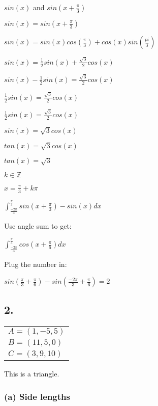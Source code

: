 \documentclass[12pt,a4paper]{article}
\begin{document}
\noindent $sin(x)$ and $sin(x+\frac{\pi}{3})$

\noindent $sin(x) = sin(x + \frac{\pi}{3})$

\noindent $sin(x) = sin(x) cos(\frac{\pi}{3}) + cos(x) sin(\frac{pi}{3})$

\noindent $sin(x) = \frac{1}{2} sin(x) + \frac{\sqrt{3}}{2} cos(x)$

\noindent $sin(x) - \frac{1}{2} sin(x) = \frac{\sqrt{3}}{2} cos(x)$

\noindent $\frac{1}{2} sin(x) = \frac{\sqrt{3}}{2} cos(x)$

\noindent $\frac{1}{2} sin(x) = \frac{\sqrt{3}}{2} cos(x)$

\noindent $sin(x) = \sqrt{3} cos(x)$

\noindent $tan(x) = \sqrt{3} cos(x)$

\noindent $tan(x) = \sqrt{3}$

\noindent $k \in \mathds{Z}$
\newline

\noindent $\boxed{x = \frac{\pi}{3} + k \pi}$
\newpage

\noindent $\int_{\frac{-2\pi}{3}}^{\frac{\pi}{3}} sin(x + \frac{\pi}{3}) - sin(x) dx$

\noindent Use angle sum to get:

\noindent $\int_{\frac{-2\pi}{3}}^{\frac{\pi}{3}} cos(x + \frac{\pi}{6}) dx$

\noindent Plug the number in:

\noindent $sin(\frac{\pi}{3} + \frac{\pi}{6}) - sin(\frac{-2\pi}{3} + \frac{\pi}{6}) = 2$

\subsection*{2.}

\begin{tabular}{| l |}
\hline
$A = (1, -5, 5)$ \\
$B = (11, 5, 0)$ \\
$C = (3, 9, 10)$ \\
\hline
\end{tabular}
\newline

\noindent This is a triangle.



\subsubsection*{(a) Side lengths}
\end{document}
